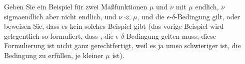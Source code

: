 
\begin{exercise}

Geben Sie ein Beispiel für zwei Maßfunktionen $\mu$ und $\nu$ mit $\mu$ endlich, $\nu$ sigmaendlich aber nicht endlich, und $\nu \ll \mu$, und die $\epsilon$-$\delta$-Bedingung gilt, oder beweisen Sie, dass es kein solches Beispiel gibt (das vorige Beispiel wird gelegentlich so formuliert, dass , die $\epsilon$-$\delta$-Bedingung gelten muss; diese Formulierung ist nicht ganz gerechtfertigt, weil es ja umso schwieriger ist, die Bedingung zu erfüllen, je kleiner $\mu$ ist).

\end{exercise}


